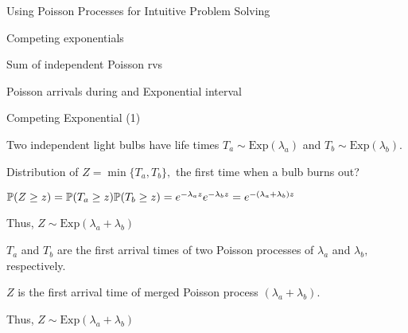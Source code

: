 \begin{frame}{Using Poisson Processes for Intuitive Problem Solving}
  
  \plitemsep 0.2in
  \bce
  
\item Competing exponentials
  
\item Sum of independent Poisson rvs
  
\item Poisson arrivals during and Exponential interval


  \ece
\end{frame}

\begin{frame}{Competing Exponential (1)}

\plitemsep 0.1in
\bci
\item Two independent light bulbs have life times $T_a \sim \text{Exp}(\lambda_a)$ and $T_b \sim \text{Exp}(\lambda_b).$

\item<2->[\redf{(Q)}] Distribution of $Z = \min\{T_a, T_b \},$ the
  first time when a bulb burns out?


\item<3-> 
  \bci
\item<3-> $\mathbb{P}( Z \geq z ) = \mathbb{P}( T_a \geq
    z )\mathbb{P}( T_b \geq z ) = e^{-\lambda_a z} e^{-\lambda_b z}=  e^{-(\lambda_a+ \lambda_b) z}$
\item<4-> Thus, $Z \sim \text{Exp}(\lambda_a + \lambda_b)$
  \eci

\item<5-> 

\bci
\item<5-> $T_a$ and $T_b$ are the first arrival times of two Poisson
  processes of $\lambda_a$ and $\lambda_b,$ respectively. 

\item<6-> $Z$ is the first arrival time of merged Poisson process
  $(\lambda_a + \lambda_b).$

\item<7-> Thus, $Z \sim \text{Exp}(\lambda_a + \lambda_b)$
\eci
\eci

\end{frame}

